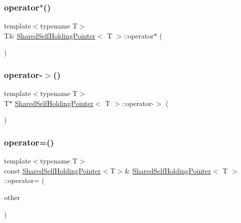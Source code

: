 \subsubsection{\texorpdfstring{operator$\ast$()}{operator*()}}
{\footnotesize\ttfamily template$<$typename T$>$ \\
T\& \hyperlink{classSharedSelfHoldingPointer}{Shared\+Self\+Holding\+Pointer}$<$ T $>$\+::operator$\ast$ (\begin{DoxyParamCaption}{ }\end{DoxyParamCaption})\hspace{0.3cm}{\ttfamily [inline]}}

\mbox{\label{classSharedSelfHoldingPointer_a510f0f53ca3c52af77422b12d6e3ffb6}} 
\subsubsection{\texorpdfstring{operator-\/$>$()}{operator->()}}
{\footnotesize\ttfamily template$<$typename T$>$ \\
T$\ast$ \hyperlink{classSharedSelfHoldingPointer}{Shared\+Self\+Holding\+Pointer}$<$ T $>$\+::operator-\/$>$ (\begin{DoxyParamCaption}{ }\end{DoxyParamCaption})\hspace{0.3cm}{\ttfamily [inline]}}

\mbox{\label{classSharedSelfHoldingPointer_afc954c0df268b48304658e3cc078a4d8}} 
\subsubsection{\texorpdfstring{operator=()}{operator=()}}
{\footnotesize\ttfamily template$<$typename T$>$ \\
const \hyperlink{classSharedSelfHoldingPointer}{Shared\+Self\+Holding\+Pointer}$<$T$>$\& \hyperlink{classSharedSelfHoldingPointer}{Shared\+Self\+Holding\+Pointer}$<$ T $>$\+::operator= (\begin{DoxyParamCaption}\item[{const \hyperlink{classSharedSelfHoldingPointer}{Shared\+Self\+Holding\+Pointer}$<$ T $>$ \&\&}]{other }\end{DoxyParamCaption})\hspace{0.3cm}{\ttfamily [inline]}}

